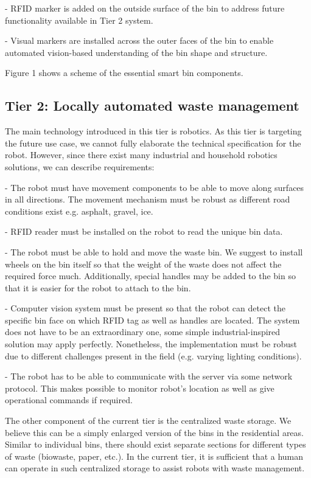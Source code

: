 \documentclass{article}
\begin{document}
- RFID marker  is added on the outside surface of the bin to address future functionality available
in Tier 2 system.

- Visual markers are installed across the outer faces of the bin to enable automated vision-based
understanding of the bin shape and structure.

Figure 1 shows a scheme of the essential smart bin components.

\subsection{Tier 2: Locally automated waste management}

The main technology introduced in this tier is robotics. As this tier is targeting the future use
case, we cannot fully elaborate the technical specification for the robot. However, since there
exist many industrial and household robotics solutions, we can describe requirements:

- The robot must have movement components to be able to move along surfaces in all directions. The
movement mechanism must be robust as different road conditions exist e.g. asphalt, gravel, ice.

- RFID reader must be installed on the robot to read the unique bin data.

- The robot must be able to hold and move the waste bin. We suggest to install wheels on the bin
itself so that the weight of the waste does not affect the required force much. Additionally,
special handles may be added to the bin so that it is easier for the robot to attach to the bin.

- Computer vision system must be present so that the robot can detect the specific bin face on which
RFID tag as well as handles are located. The system does not have to be an extraordinary one, some
simple industrial-inspired solution may apply perfectly. Nonetheless, the implementation must be
robust due to different challenges present in the field (e.g. varying lighting conditions).

- The robot has to be able to communicate with the server via some network protocol. This makes
possible to monitor robot's location as well as give operational commands if required.

The other component of the current tier is the centralized waste storage. We believe this can be a
simply enlarged version of the bins in the residential areas. Similar to individual bins, there
should exist separate sections for different types of waste (biowaste, paper, etc.). In the current
tier, it is sufficient that a human can operate in such centralized storage to assist robots with
waste management.
\end{document}
